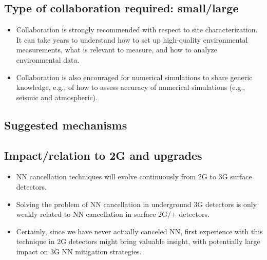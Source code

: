 \subsection{Type of collaboration required:  small/large}
\begin{itemize}
\item Collaboration is strongly recommended with respect to site characterization. It can take years to understand how to set up high-quality environmental measurements, what is relevant to measure, and how to analyze environmental data.
\item Collaboration is also encouraged for numerical simulations to share generic knowledge, e.g., of how to assess accuracy of numerical simulations (e.g., seismic and atmospheric). 
\end{itemize}

\subsection{Suggested mechanisms}

\subsection{Impact/relation to 2G and upgrades}
\begin{itemize}
\item NN cancellation techniques will evolve continuously from 2G to 3G surface detectors. 
\item Solving the problem of NN cancellation in underground 3G detectors is only weakly related to NN cancellation in surface 2G/+ detectors. 
\item Certainly, since we have never actually canceled NN, first experience with this technique in 2G detectors might bring valuable insight, with potentially large impact on 3G NN mitigation strategies.
\end{itemize}
